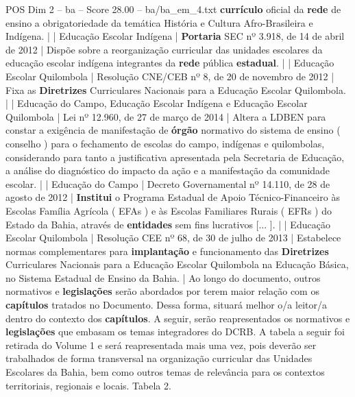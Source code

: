 \begin{textsample}{POS Dim 2 – ba – Score 28.00 – ba/ba\_em\_4.txt}
\textbf{currículo} oficial da \textbf{rede} de ensino a obrigatoriedade da temática História e Cultura Afro-Brasileira e Indígena. | | Educação Escolar Indígena | \textbf{Portaria} SEC nº 3.918, de 14 de abril de 2012 | Dispõe sobre a reorganização curricular das unidades escolares da educação escolar indígena integrantes da \textbf{rede} pública \textbf{estadual}. | | Educação Escolar Quilombola | Resolução CNE/CEB nº 8, de 20 de novembro de 2012 | Fixa as \textbf{Diretrizes} Curriculares Nacionais para a Educação Escolar Quilombola. | | Educação do Campo, Educação Escolar Indígena e Educação Escolar Quilombola | Lei nº 12.960, de 27 de março de 2014 | Altera a LDBEN para constar a exigência de manifestação de \textbf{órgão} normativo do sistema de ensino ( conselho ) para o fechamento de escolas do campo, indígenas e quilombolas, considerando para tanto a justificativa apresentada pela Secretaria de Educação, a análise do diagnóstico do impacto da ação e a manifestação da comunidade escolar. | | Educação do Campo | Decreto Governamental nº 14.110, de 28 de agosto de 2012 | \textbf{Institui} o Programa Estadual de Apoio Técnico-Financeiro às Escolas Família Agrícola ( EFAs ) e às Escolas Familiares Rurais ( EFRs ) do Estado da Bahia, através de \textbf{entidades} sem fins lucrativos [... ]. | | Educação Escolar Quilombola | Resolução CEE nº 68, de 30 de julho de 2013 | Estabelece normas complementares para \textbf{implantação} e funcionamento das \textbf{Diretrizes} Curriculares Nacionais para a Educação Escolar Quilombola na Educação Básica, no Sistema Estadual de Ensino da Bahia. | Ao longo do documento, outros normativos e \textbf{legislações} serão abordados por terem maior relação com os \textbf{capítulos} tratados no Documento.
Dessa forma, situará melhor o/a leitor/a dentro do contexto dos \textbf{capítulos}.
A seguir, serão reapresentados os normativos e \textbf{legislações} que embasam os temas integradores do DCRB.
A tabela a seguir foi retirada do Volume 1 e será reapresentada mais uma vez, pois deverão ser trabalhados de forma transversal na organização curricular das Unidades Escolares da Bahia, bem como outros temas de relevância para os contextos territoriais, regionais e locais.
Tabela 2.

\end{textsample}
